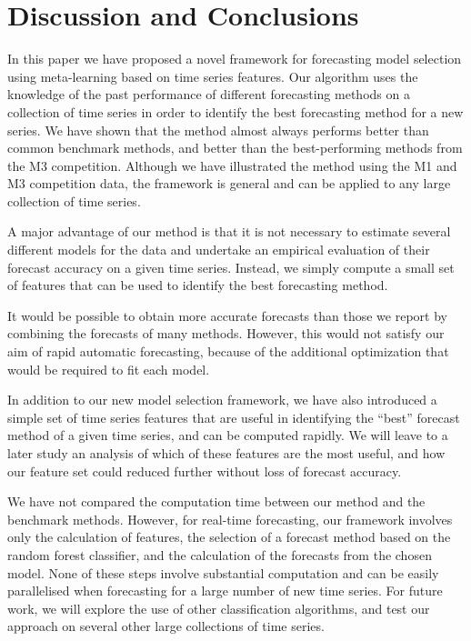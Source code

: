 \documentclass[11pt,a4paper,]{article}
\theoremstyle{definition}
\theoremstyle{definition}
\theoremstyle{definition}
\theoremstyle{remark}
\begin{document}
\newpage

\section{Discussion and Conclusions}\label{discussion}

In this paper we have proposed a novel framework for forecasting model
selection using meta-learning based on time series features. Our
algorithm uses the knowledge of the past performance of different
forecasting methods on a collection of time series in order to identify
the best forecasting method for a new series. We have shown that the
method almost always performs better than common benchmark methods, and
better than the best-performing methods from the M3 competition.
Although we have illustrated the method using the M1 and M3 competition
data, the framework is general and can be applied to any large
collection of time series.

A major advantage of our method is that it is not necessary to estimate
several different models for the data and undertake an empirical
evaluation of their forecast accuracy on a given time series. Instead,
we simply compute a small set of features that can be used to identify
the best forecasting method.

It would be possible to obtain more accurate forecasts than those we
report by combining the forecasts of many methods. However, this would
not satisfy our aim of rapid automatic forecasting, because of the
additional optimization that would be required to fit each model.

In addition to our new model selection framework, we have also
introduced a simple set of time series features that are useful in
identifying the ``best'' forecast method of a given time series, and can
be computed rapidly. We will leave to a later study an analysis of which
of these features are the most useful, and how our feature set could
reduced further without loss of forecast accuracy.

We have not compared the computation time between our method and the
benchmark methods. However, for real-time forecasting, our framework
involves only the calculation of features, the selection of a forecast
method based on the random forest classifier, and the calculation of the
forecasts from the chosen model. None of these steps involve substantial
computation and can be easily parallelised when forecasting for a large
number of new time series. For future work, we will explore the use of
other classification algorithms, and test our approach on several other
large collections of time series.
\end{document}
